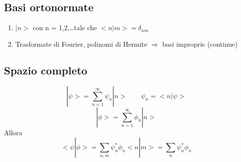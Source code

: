 \documentclass[a4paper,11pt]{report}
\theoremstyle{remark}
\theoremstyle{definition}
\begin{document}
\subsection*{Basi ortonormate}
\begin{enumerate}
    \item $|n> $ con n = 1,2,\dots tale che $<n|m> = \delta_{nm}$
    \item Trasformate di Fourier, polinomi di Hermite $\Rightarrow$ basi improprie (continue)
\end{enumerate}

\subsection*{Spazio completo}

\begin{equation*}
    |\psi> = \sum_{n=1}^\infty \psi_n |n> \qquad \psi_n = <n | \psi>
\end{equation*}
\begin{equation*}
    |\phi > = \sum_{n=1}^\infty \phi_n |n>
\end{equation*}
Allora 
\begin{equation*}
    <\psi| \phi> = \sum_{n,m} \psi_n^* \phi_n <n|m> = \sum_n \psi^*_n \phi_n
\end{equation*}
\end{document}
